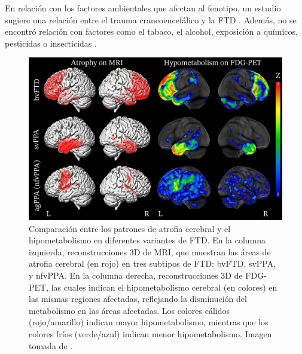 En relación con los factores ambientales que afectan al fenotipo, un estudio sugiere una relación entre el trauma craneoencefálico y la FTD \cite{granadillo2008genetica, rosso2003medical}. Además, no se encontró relación con factores como el tabaco, el alcohol, exposición a químicos, pesticidas o insecticidas \cite{rosso2003medical}. 


\begin{figure}[h]
	\centering
	\includegraphics[width=0.75\linewidth]{figures/introduction/differences.jpg}
	\caption{Comparación entre los patrones de atrofia cerebral y el hipometabolismo en diferentes variantes de FTD. En la columna izquierda, reconstrucciones 3D de MRI, que muestran las áreas de atrofia cerebral (en rojo) en tres subtipos de FTD: bvFTD, svPPA, y nfvPPA. En la columna derecha, reconstrucciones 3D de FDG-PET, las cuales indican el hipometabolismo cerebral (en colores) en las mismas regiones afectadas, reflejando la disminución del metabolismo en las áreas afectadas. Los colores cálidos (rojo/amarillo) indican mayor hipometabolismo, mientras que los colores fríos (verde/azul) indican menor hipometabolismo. Imagen tomada de \cite{peet2021neuroimaging}.}
	\label{fig:comparacion_imagenes_diagnostico}
\end{figure}

